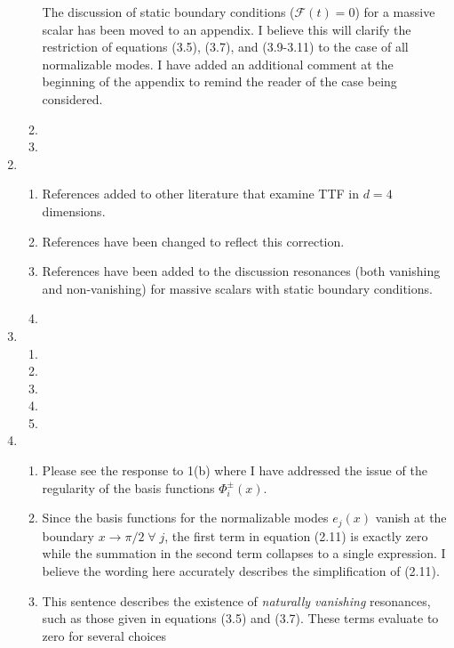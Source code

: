 \documentclass[11pt,letterpaper]{article}
\newcommand{\mc}{\mathcal}
\begin{document}
\begin{enumerate}
\begin{enumerate}
        The discussion of static boundary conditions ($\mc F(t) = 0$) for a massive scalar has been moved to an appendix. I believe this will clarify the restriction of equations (3.5), (3.7), and (3.9-3.11) to the case of all normalizable modes. I have added an additional comment at the beginning of the appendix to remind the reader of the case being considered.
        \item 
        \item
    \end{enumerate}
    \item %
    \begin{enumerate}
        \item References added to other literature that examine TTF in $d = 4$ dimensions.
        \item References have been changed to reflect this correction.
        \item References have been added to the discussion resonances (both vanishing and non-vanishing) for massive scalars with static boundary conditions.
        \item 
    \end{enumerate}
    \item %
    \begin{enumerate}
        \item 
        \item 
        \item 
        \item 
        \item 
    \end{enumerate}
    \item %
    \begin{enumerate}
        \item Please see the response to 1(b) where I have addressed the issue of the regularity 
        of the basis functions $\Phi^\pm_i(x)$.
        \item Since the basis functions for the normalizable modes $e_j(x)$ vanish at the boundary
        ${x \to \pi/2 \; \forall \; j}$, the first term in equation (2.11) is exactly zero while the 
        summation in the second term collapses to a single expression. I believe the wording here 
        accurately describes the simplification of (2.11).
        \item This sentence describes the existence of \emph{naturally vanishing} resonances, such 
        as those given in equations (3.5) and (3.7). These terms evaluate to zero for several choices 

\end{enumerate}
\end{enumerate}
\end{document}
